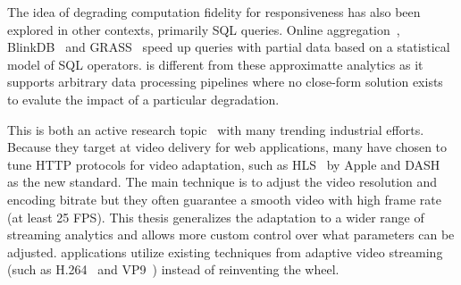  The idea of degrading computation fidelity for
responsiveness has also been explored in other contexts, primarily SQL
queries. Online aggregation~\cite{hellerstein1997online},
BlinkDB~\cite{agarwal2013blinkdb} and GRASS~\cite{ananthanarayanan2014grass}
speed up queries with partial data based on a statistical model of SQL
operators. \sysname{} is different from these approximatte analytics as it
supports arbitrary data processing pipelines where no close-form solution exists
to evalute the impact of a particular degradation.

 This is both an active research
topic~\cite{sun2016cs2p, yin2015control} with many trending industrial efforts.
Because they target at video delivery for web applications, many have chosen to
tune HTTP protocols for video adaptation, such as HLS~\cite{pantos2016http} by
Apple and DASH~\cite{michalos2012dynamic} as the new standard. The main
technique is to adjust the video resolution and encoding bitrate but they often
guarantee a smooth video with high frame rate (at least 25 FPS). This thesis
generalizes the adaptation to a wider range of streaming analytics and allows
more custom control over what parameters can be adjusted. \sysname{}
applications utilize existing techniques from adaptive video streaming (such as
H.264~\cite{richardson2011h} and VP9~\cite{grange2016vp9}) instead of
reinventing the wheel.

